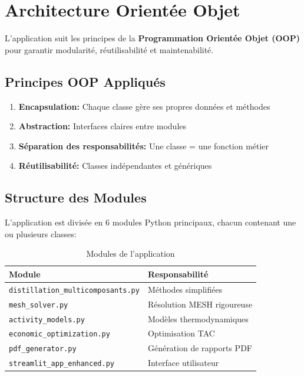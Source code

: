 \documentclass[11pt,a4paper]{article}
\begin{document}
\section{Architecture Orientée Objet}

L'application suit les principes de la \textbf{Programmation Orientée Objet (OOP)} pour garantir modularité, réutilisabilité et maintenabilité.

\subsection{Principes OOP Appliqués}

\begin{enumerate}
\item \textbf{Encapsulation:} Chaque classe gère ses propres données et méthodes
\item \textbf{Abstraction:} Interfaces claires entre modules
\item \textbf{Séparation des responsabilités:} Une classe = une fonction métier
\item \textbf{Réutilisabilité:} Classes indépendantes et génériques
\end{enumerate}

\subsection{Structure des Modules}

L'application est divisée en 6 modules Python principaux, chacun contenant une ou plusieurs classes:

\begin{table}[h]
\centering
\begin{tabular}{lp{8cm}}
\toprule
\textbf{Module} & \textbf{Responsabilité} \\
\midrule
\texttt{distillation\_multicomposants.py} & Méthodes simplifiées \\
\texttt{mesh\_solver.py} & Résolution MESH rigoureuse \\
\texttt{activity\_models.py} & Modèles thermodynamiques \\
\texttt{economic\_optimization.py} & Optimisation TAC \\
\texttt{pdf\_generator.py} & Génération de rapports PDF \\
\texttt{streamlit\_app\_enhanced.py} & Interface utilisateur \\
\bottomrule
\end{tabular}
\caption{Modules de l'application}
\end{table}
\end{document}
